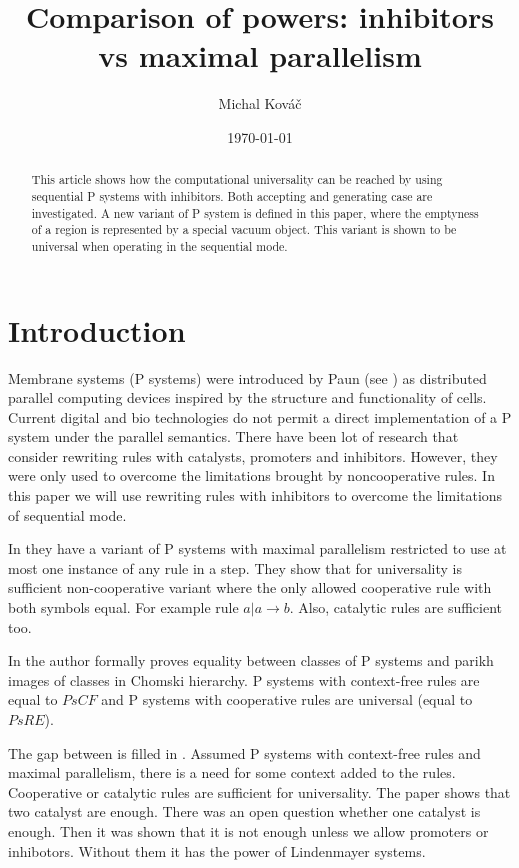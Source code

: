 \documentclass[a4paper,10pt]{article}
\begin{document}
\title{Comparison of powers: inhibitors vs maximal parallelism}
\author{Michal Kováč}
\date{\today}
\maketitle

\begin{abstract}
This article shows how the computational universality can be reached by using sequential P systems with inhibitors. Both accepting and generating case are investigated. A new variant of P system is defined in this paper, where the emptyness of a region is represented by a special vacuum object. This variant is shown to be universal when operating in the sequential mode.
\end{abstract}

\section{Introduction}
Membrane systems (P systems) were introduced by Paun (see \cite{Paun2000108}) as distributed parallel computing devices inspired by the structure and functionality of cells.
Current digital and bio technologies do not permit a direct implementation of a P system under the parallel semantics. 
There have been lot of research that consider rewriting rules with catalysts, promoters and inhibitors. However, they were only used to overcome the limitations brought by noncooperative rules. 
In this paper we will use rewriting rules with inhibitors to overcome the limitations of sequential mode.

In \cite{Ibarra04dang:the} they have a variant of P systems with maximal parallelism restricted to use at most one instance of any rule in a step.
They show that for universality is sufficient non-cooperative variant where the only allowed cooperative rule with both symbols equal. For example rule $a|a\rightarrow b$. Also, catalytic rules are sufficient too.

In \cite{Sburlan05dragos} the author formally proves equality between classes of P systems and parikh images of classes in Chomski hierarchy. P systems with context-free rules are equal to $PsCF$ and P systems with cooperative rules are universal (equal to $PsRE$).


The gap between is filled in \cite{Ionescu:jucs_10_5:on_p_systems_with}. Assumed P systems with context-free rules and maximal parallelism, there is a need for some context added to the rules. Cooperative or catalytic rules are sufficient for universality. The paper shows that two catalyst are enough. There was an open question whether one catalyst is enough. Then it was shown that it is not enough unless we allow promoters or inhibotors. Without them it has the power of Lindenmayer systems.
\end{document}
